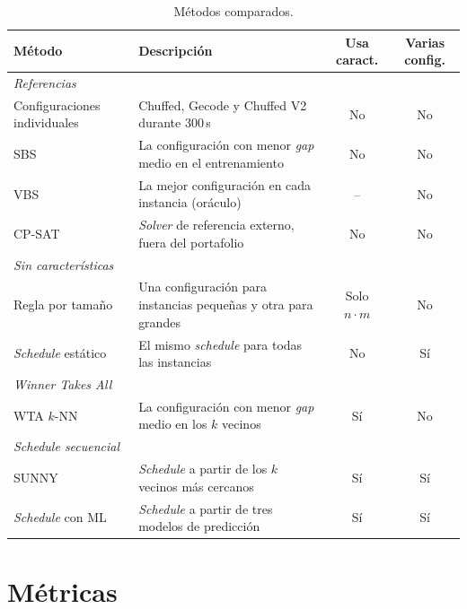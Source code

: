 \begin{table}[H]
  \centering
  \small
  \singlespacing
  \caption{Métodos comparados.}
  \label{tab:metodos}
  \begin{tabularx}{\textwidth}{l >{\raggedright\arraybackslash}X c c}
    \toprule
    \textbf{Método} & \textbf{Descripción} & \textbf{Usa caract.} & \textbf{Varias config.} \\
    \midrule
    \multicolumn{4}{l}{\textit{Referencias}} \\
    Configuraciones individuales & Chuffed, Gecode y Chuffed V2 durante 300\,s & No & No \\
    SBS & La configuración con menor \textit{gap} medio en el entrenamiento & No & No \\
    VBS & La mejor configuración en cada instancia (oráculo) & -- & No \\
    CP-SAT & \textit{Solver} de referencia externo, fuera del portafolio & No & No \\
    \midrule
    \multicolumn{4}{l}{\textit{Sin características}} \\
    Regla por tamaño & Una configuración para instancias pequeñas y otra para grandes & Solo $n \cdot m$ & No \\
    \textit{Schedule} estático & El mismo \textit{schedule} para todas las instancias & No & Sí \\
    \midrule
    \multicolumn{4}{l}{\textit{Winner Takes All}} \\
    WTA $k$-NN & La configuración con menor \textit{gap} medio en los $k$ vecinos & Sí & No \\
    \midrule
    \multicolumn{4}{l}{\textit{Schedule secuencial}} \\
    SUNNY & \textit{Schedule} a partir de los $k$ vecinos más cercanos & Sí & Sí \\
    \textit{Schedule} con ML & \textit{Schedule} a partir de tres modelos de predicción & Sí & Sí \\
    \bottomrule
  \end{tabularx}
\end{table}

\section{Métricas}
\label{sec:metricas}

